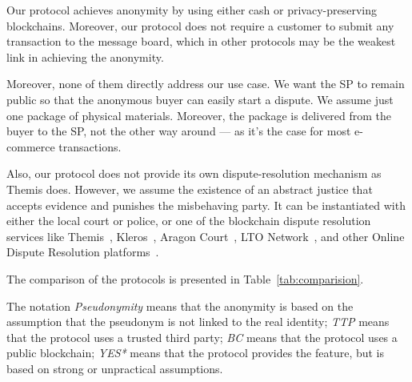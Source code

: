 \documentclass[pdftex,twocolumn,epjc3]{svjour3}
\begin{document}
Our protocol achieves anonymity by using either cash or privacy-preserving blockchains. Moreover, our protocol does not require a customer to submit any transaction to the message board, which in other protocols may be the weakest link in achieving the anonymity.

Moreover, none of them directly address our use case. We want the SP to remain public so that the anonymous buyer can easily start a dispute. We assume just one package of physical materials. Moreover, the package is delivered from the buyer to the SP, not the other way around — as it's the case for most e-commerce transactions.

Also, our protocol does not provide its own dispute-resolution mechanism as Themis does. However, we assume the existence of an abstract justice that accepts evidence and punishes the misbehaving party. 
It can be instantiated with either the local court or police, or one of the blockchain
dispute resolution services like Themis~\cite{mengThemisDecentralizedEscrow2019}, Kleros~\cite{bergollaKlerosSociolegalCase2022,gudkovCrowdArbitrationBlockchain2020}, Aragon Court~\cite{aragonDecentralizedDisputeResolution}, LTO Network~\cite{ltonetworkNextGenBlockchainB2B,ltonetworkOnchainIdentitiesCredentials}, and other Online Dispute Resolution platforms~\cite{allenGovernanceBlockchainDispute2019}.


The comparison of the protocols is presented in Table~\ref{tab:comparision}.

The notation \textit{Pseudonymity} means that the anonymity is based on the assumption that the pseudonym is not linked to the real identity; \textit{TTP} means that the protocol uses a trusted third party; \textit{BC} means that the protocol uses a public blockchain; \textit{YES*} means that the protocol provides the feature, but is based on strong or unpractical assumptions.
\end{document}

